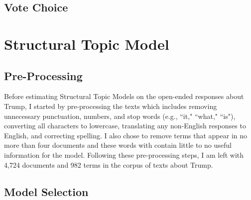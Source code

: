 \documentclass[12pt]{article}
\begin{document}
\begin{appendices}
\begin{refsection}
%

\clearpage


\subsection{Vote Choice}\label{si:mods:votechoice}

\clearpage






\section{Structural Topic Model}\label{si:stm}

\subsection{Pre-Processing}\label{si:preprocessing}
Before estimating Structural Topic Models on the open-ended responses about Trump, I started by pre-processing the texts which includes removing unnecessary punctuation, numbers, and stop words (e.g., ``it," ``what," ``is"), converting all characters to lowercase, translating any non-English responses to English, and correcting spelling. I also chose to remove terms that appear in no more than four documents and these words with contain little to no useful information for the model. Following these pre-processing steps, I am left with 4,724 documents and 982 terms in the corpus of texts about Trump.

\subsection{Model Selection}\label{si:modelselection}


\end{refsection}
\end{appendices}
\end{document}
